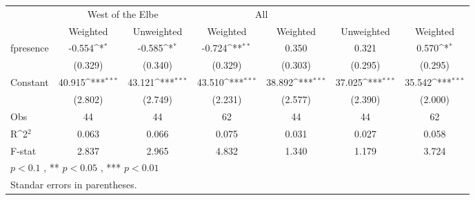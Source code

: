 {
\def\sym#1{\ifmmode^{#1}\else\(^{#1}\)\fi}
\begin{tabular}{@{\extracolsep{2pt}}l*{6}{c}@{}}
\hline\hline
& \multicolumn{2}{c}{West of the Elbe} & \multicolumn{2}{c}{All} \\
\cline{2-3-4}
\cline{5-6}
 & Weighted & Unweighted & Weighted & Weighted & Unweighted & Weighted \\
\hline
fpresence & -0.554\sym{*} & -0.585\sym{*} & -0.724\sym{**} & 0.350 & 0.321 & 0.570\sym{*} \\
 & (0.329) & (0.340) & (0.329) & (0.303) & (0.295) & (0.295) \\
Constant & 40.915\sym{***} & 43.121\sym{***} & 43.510\sym{***} & 38.892\sym{***} & 37.025\sym{***} & 35.542\sym{***} \\
 & (2.802) & (2.749) & (2.231) & (2.577) & (2.390) & (2.000) \\

\hline
Obs & 44 & 44 & 62 & 44 & 44 & 62 \\
R\sym{2} & 0.063 & 0.066 & 0.075 & 0.031 & 0.027 & 0.058 \\
F-stat & 2.837 & 2.965 & 4.832 & 1.340 & 1.179 & 3.724 \\
\hline\hline
\multicolumn{7}{l}{\footnotesize *$p < 0.1$ , ** $p < 0.05$ , *** $p < 0.01$} \\
\multicolumn{7}{l}{\footnotesize Standar errors in parentheses.} \\
\end{tabular}
}